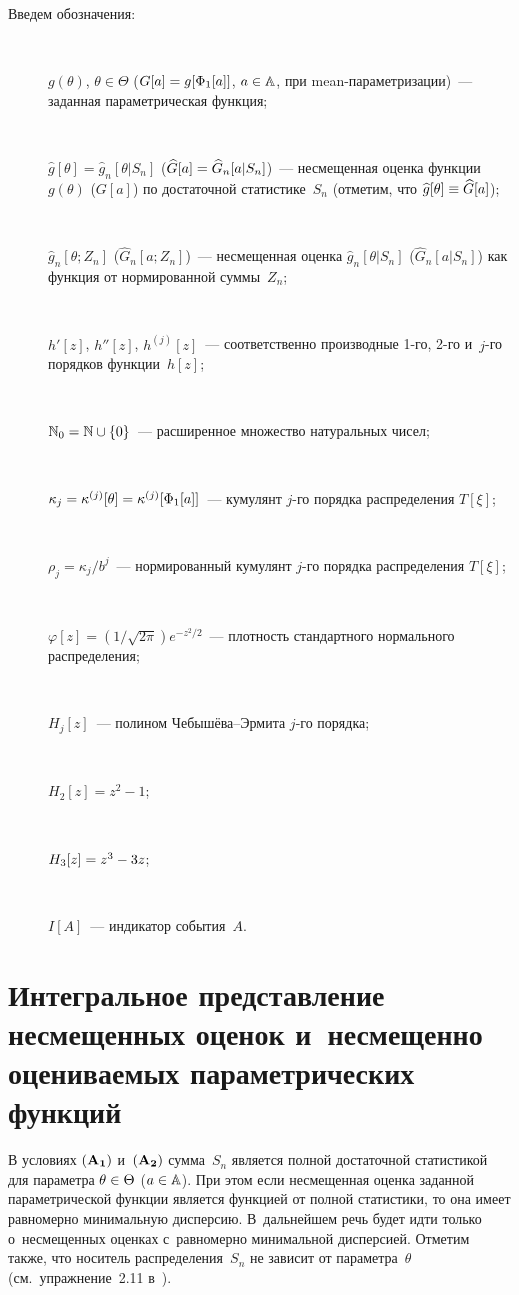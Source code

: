 \begin{multicols}{2}
  Введем обозначения:
\begin{description}
\item[\,]
 $g(\theta)$, $\theta\in \Theta$ ($G[a]\hm=g[\Phi_1[a]]$, $a\hm\in \mathbb {A}$, при 
 mean-па\-ра\-мет\-ри\-за\-ции)~--- заданная параметрическая функция;
\item[\,]
 $\widehat{g}[\theta]=\widehat{g}_n[\theta|S_n]$
 ($\widehat{G}[a]\hm=\widehat{G}_n[a|S_n]$)~--- несмещенная оценка функции
 $g(\theta)$ ($G[a]$) по достаточной статистике~$S_n$ (отметим, что $\widehat{g}[\theta]\hm\equiv \widehat{G}[a]$);
\item[\,]
 $\widehat{g}_n[\theta;Z_n]$ ($\widehat{G}_n[a;Z_n]$)~--- несмещенная оценка
 $\widehat{g}_n[\theta|S_n]$ ($\widehat{G}_n[a|S_n]$) как функция от нормированной суммы~$Z_n$;
\item[\,]
 $h'[z]$,  $h''[z]$, $h^{(j)}[z]$~--- соответственно производные 1-го, 2-го и~$j$-го порядков функции~$h[z]$;
\item[\,]
 $\mathbb{N}_0=\mathbb{N} \cup \{0\}$~--- расширенное множество натуральных чисел;
\item[\,]
 $\kappa_j =\kappa^{(j)} [\theta]\hm=\kappa^{(j)} [\Phi_1[a]]$~--- кумулянт $j$-го порядка распределения $T[\xi]$;
\item[\,]
 $\rho_j =\kappa_j/b^j$~--- нормированный кумулянт $j$-го порядка распределения $T[\xi]$;
\item[\,]
 $\varphi[z]=({1}/{\sqrt{2\pi}}) e^{-z^2/2}$~--- плотность стандартного нормального распределения;
\item[\,]
 $H_j[z]$~--- полином Че\-бы\-шё\-ва--Эр\-ми\-та $j$-го по\-рядка;
\item[\,]
 $H_2[z]=z^2-1$; 
 \item[\,]
 $H_3[z]\hm=z^3-3z$;
\item[\,]
 $I[A]$~--- индикатор события~$A$.
 \end{description}

\section{Интегральное представление несмещенных оценок и~несмещенно оцениваемых параметрических функций}

 В условиях $\bf (A_1)$ и~$\bf(A_2)$ сумма~$S_n$ является полной достаточной статистикой
 для параметра $\theta\hm\in \Theta$ ($a\hm\in \mathbb {A}$). При этом если несмещенная оценка заданной параметрической функции является функцией от полной статистики, то она имеет равномерно минимальную дисперсию. В~дальнейшем речь будет идти только о~несмещенных оценках с~равномерно минимальной дисперсией.
 Отметим также, что носитель распределения~$S_n$ не зависит от параметра~$\theta$
 (см.\ упражнение~2.11 в~\cite{15-ch}).


\end{multicols}
